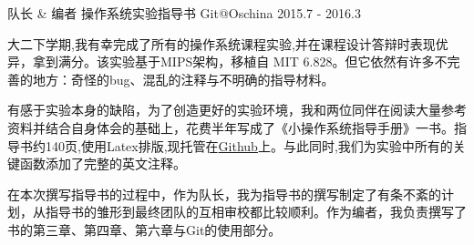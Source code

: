 


\begin{cventries}


\cventry
{队长 \& 编者} %
{操作系统实验指导书} %
{Git@Oschina} %
{2015.7 - 2016.3} %
{ %
\begin{cvitems}
\item {大二下学期,我有幸完成了所有的操作系统课程实验,并在课程设计答辩时表现优异，拿到满分。该实验基于MIPS架构，移植自 MIT 6.828。但它依然有许多不完善的地方：奇怪的bug、混乱的注释与不明确的指导材料。}
\item {有感于实验本身的缺陷，为了创造更好的实验环境，我和两位同伴在阅读大量参考资料并结合自身体会的基础上，花费半年写成了《小操作系统指导手册》一书。指导书约140页,使用Latex排版,现托管在\href{https://github.com/SivilTaram/BUAAOS-guide-book}{Github}上。与此同时,我们为实验中所有的关键函数添加了完整的英文注释。}
\item {在本次撰写指导书的过程中，作为队长，我为指导书的撰写制定了有条不紊的计划，从指导书的雏形到最终团队的互相审校都比较顺利。作为编者，我负责撰写了书的第三章、第四章、第六章与Git的使用部分。}
\end{cvitems}
}


\end{cventries}